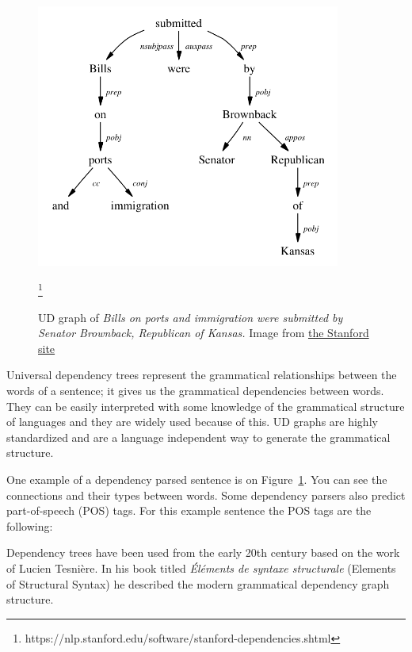 \begin{figure}[!ht]
	\centering
	\includegraphics[width=100mm, keepaspectratio]{figures/UD.png}
	\caption{UD graph of \textit{Bills on ports and immigration were submitted by Senator Brownback, Republican of Kansas.} Image from \href{https://nlp.stanford.edu/software/stanford-dependencies.shtml}{the Stanford site}}\footnote{https://nlp.stanford.edu/software/stanford-dependencies.shtml}
	\label{fig:UD}
\end{figure}

Universal dependency trees represent the grammatical relationships between the words of a sentence; it gives us the grammatical dependencies between words. They can be easily interpreted with some knowledge of the grammatical structure of languages and they are widely used because of this. UD graphs are highly standardized and are a language independent way to generate the grammatical structure.

One example of a dependency parsed sentence is on Figure~\ref{fig:UD}. You can see the connections and their types between words. Some dependency parsers also predict part-of-speech (POS) tags. For this example sentence the POS tags are the following:

Dependency trees have been used from the early 20th century based on the work of Lucien Tesni\`ere. In his book titled \textit{\'El\'ements de syntaxe structurale} (Elements of Structural Syntax)\cite{UD} he described the modern grammatical dependency graph structure.

